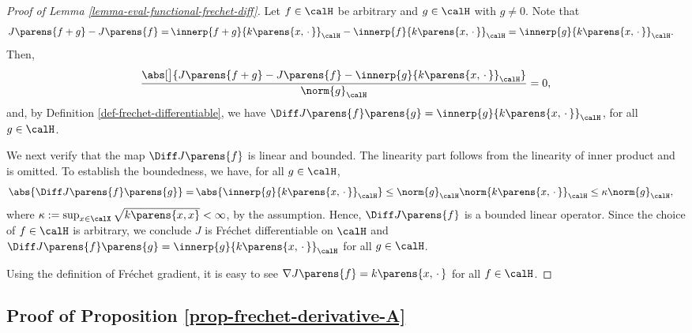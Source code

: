\documentclass[12pt]{article}
\theoremstyle{definition}
\theoremstyle{theorem}
\newtheorem{proposition}{Proposition}
\theoremstyle{remark}
\begin{document}
\begin{proof}[Proof of Lemma \ref{lemma-eval-functional-frechet-diff}]
	Let $f \in \calH$ be arbitrary and $g \in \calH$ with $g \neq 0$. Note that 
	\begin{align*}
		J \parens{f + g} - J \parens{f} = & \, \innerp{f + g}{k \parens{x, \,\cdot\,}}_{\calH} - \innerp{f}{k \parens{x, \,\cdot\,}}_{\calH} 
		= \innerp{g}{k \parens{x, \,\cdot\,}}_{\calH}. 
	\end{align*}
	Then, 
	\begin{align*}
		\frac{\abs[\big]{J \parens{f + g} - J \parens{f} - \innerp{g}{k \parens{x, \,\cdot\,}}_{\calH}}}{\norm{g}_{\calH}} = 0, 
	\end{align*}
	and, by Definition \ref{def-frechet-differentiable}, we have $\Diff J \parens{f} \parens{g} = \innerp{g}{k \parens{x, \,\cdot\,}}_{\calH}$, for all $g \in \calH$. 
	
	We next verify that the map $\Diff J \parens{f}$ is linear and bounded. The linearity part follows from the linearity of inner product and is omitted. To establish the boundedness, we have, for all $g \in \calH$, 
	\begin{align*}
		\abs{\Diff J \parens{f} \parens{g}} = & \, \abs{\innerp{g}{k \parens{x, \,\cdot\,}}_{\calH}} 
		\le \norm{g}_{\calH} \norm{k \parens{x, \,\cdot\,}}_{\calH} 
		\le \kappa \norm{g}_{\calH}, 
	\end{align*}
	where $\kappa := \sup_{x \in \calX} \sqrt{k \parens{x, x}} < \infty$, by the assumption. Hence, $\Diff J \parens{f}$ is a bounded linear operator. Since the choice of $f \in \calH$ is arbitrary, we conclude $J$ is Fr{\'e}chet differentiable on $\calH$ and $\Diff J \parens{f} \parens{g} = \innerp{g}{k \parens{x, \,\cdot\,}}_{\calH}$ for all $g \in \calH$. 
	
	Using the definition of Fr{\'e}chet gradient, it is easy to see $\nabla J \parens{f} = k \parens{x, \,\cdot\,}$ for all $f \in \calH$. 
\end{proof}


\subsection{Proof of Proposition \ref{prop-frechet-derivative-A}}

\end{document}
